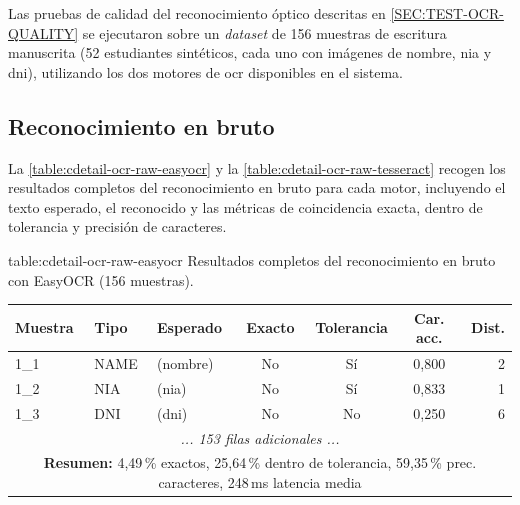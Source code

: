 Las pruebas de calidad del reconocimiento óptico descritas en
\cref{SEC:TEST-OCR-QUALITY} se ejecutaron sobre un \textit{dataset} de
156 muestras de escritura manuscrita (52 estudiantes sintéticos, cada
uno con imágenes de nombre, \acs{nia} y \acs{dni}), utilizando los dos
motores de \acs{ocr} disponibles en el sistema.

\subsection{Reconocimiento en bruto}

La \cref{table:cdetail-ocr-raw-easyocr} y la
\cref{table:cdetail-ocr-raw-tesseract} recogen los resultados completos
del reconocimiento en bruto para cada motor, incluyendo el texto
esperado, el reconocido y las métricas de coincidencia exacta, dentro
de tolerancia y precisión de caracteres.

\begin{table}[Resultados OCR en bruto — EasyOCR]%
            {table:cdetail-ocr-raw-easyocr}%
            {Resultados completos del reconocimiento en bruto con
             EasyOCR (156 muestras).}
  \small
  \renewcommand{\arraystretch}{1.2}
  \begin{tabular}{l l l c c c r}
    \hline
    \textbf{Muestra} & \textbf{Tipo} & \textbf{Esperado} & \textbf{Exacto} &
    \textbf{Tolerancia} & \textbf{Car. acc.} & \textbf{Dist.} \\
    \hline
    1\_1  & NAME & (nombre) & No & Sí & 0{,}800 & 2 \\
    1\_2  & NIA  & (nia)    & No & Sí & 0{,}833 & 1 \\
    1\_3  & DNI  & (dni)    & No & No & 0{,}250 & 6 \\
    \multicolumn{7}{c}{\textit{... 153 filas adicionales ...}} \\
    \hline
    \multicolumn{7}{c}{\textbf{Resumen:} 4{,}49\,\% exactos,
                        25{,}64\,\% dentro de tolerancia,
                        59{,}35\,\% prec. caracteres,
                        248\,ms latencia media} \\
    \hline
  \end{tabular}
\end{table}

